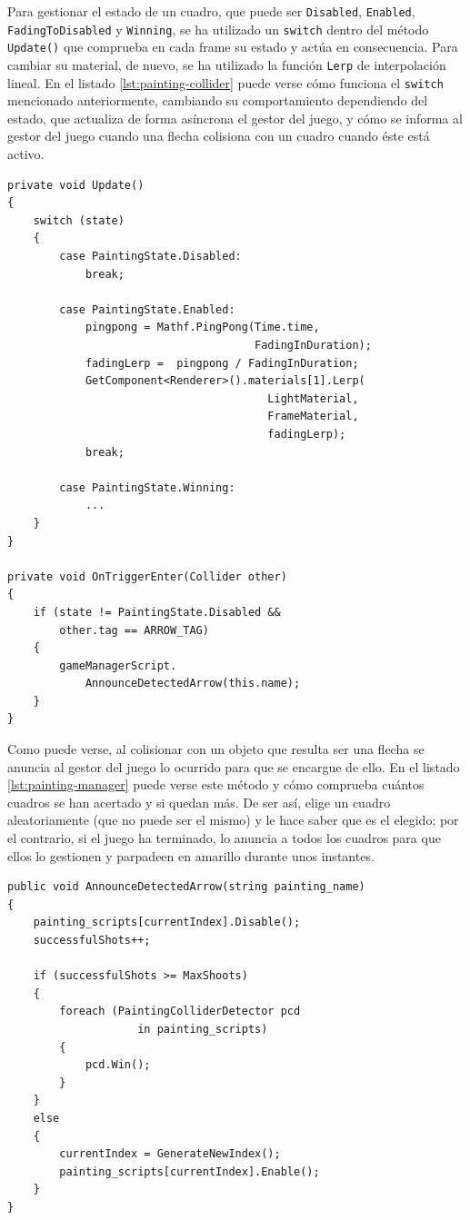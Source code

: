 Para gestionar el estado de un cuadro, que puede ser \texttt{Disabled}, \texttt{Enabled}, \texttt{FadingToDisabled} y \texttt{Winning}, se ha utilizado un \texttt{switch} dentro del método \texttt{Update()} que comprueba en cada frame su estado y actúa en consecuencia. Para cambiar su material, de nuevo, se ha utilizado la función \texttt{Lerp} de interpolación lineal. 
En el listado \ref{lst:painting-collider} puede verse cómo funciona el \texttt{switch} mencionado anteriormente, cambiando su comportamiento dependiendo del estado, que actualiza de forma asíncrona el gestor del juego, y cómo se informa al gestor del juego cuando una flecha colisiona con un cuadro cuando éste está activo.

\begin{lstlisting}[caption=Fragmento del script para actualizar un cuadro, label=lst:painting-collider]
private void Update()
{
    switch (state)
    {
        case PaintingState.Disabled:
            break;
        
        case PaintingState.Enabled:
            pingpong = Mathf.PingPong(Time.time, 
                                      FadingInDuration);
            fadingLerp =  pingpong / FadingInDuration;
            GetComponent<Renderer>().materials[1].Lerp(
                                        LightMaterial,
                                        FrameMaterial,
                                        fadingLerp);
            break;
    
        case PaintingState.Winning:
            ...
    }
}

private void OnTriggerEnter(Collider other)
{
    if (state != PaintingState.Disabled && 
        other.tag == ARROW_TAG)
    {
        gameManagerScript.
            AnnounceDetectedArrow(this.name);
    }
}
\end{lstlisting}

Como puede verse, al colisionar con un objeto que resulta ser una flecha se anuncia al gestor del juego lo ocurrido para que se encargue de ello. En el listado \ref{lst:painting-manager} puede verse este método y cómo comprueba cuántos cuadros se han acertado y si quedan más. De ser así, elige un cuadro aleatoriamente (que no puede ser el mismo) y le hace saber que es el elegido; por el contrario, si el juego ha terminado, lo anuncia a todos los cuadros para que ellos lo gestionen y parpadeen en amarillo durante unos instantes.

\begin{lstlisting}[caption=Fragmento del script para gestionar el juego del arco, label=lst:painting-manager]
public void AnnounceDetectedArrow(string painting_name)
{
    painting_scripts[currentIndex].Disable();
    successfulShots++;

    if (successfulShots >= MaxShoots)
    {
        foreach (PaintingColliderDetector pcd
                    in painting_scripts)
        {
            pcd.Win();
        }
    }
    else
    {
        currentIndex = GenerateNewIndex();
        painting_scripts[currentIndex].Enable();
    }
}
\end{lstlisting}

